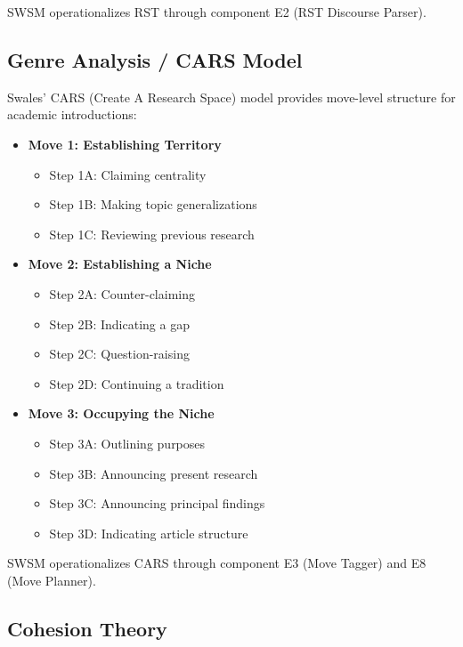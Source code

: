 SWSM operationalizes RST through component E2 (RST Discourse Parser).

\subsection{Genre Analysis / CARS Model}
\label{sec:sw-cars}

Swales' CARS (Create A Research Space) model \citep{swales1990genre} provides move-level structure for academic introductions:

\begin{itemize}
    \item \textbf{Move 1: Establishing Territory}
    \begin{itemize}
        \item Step 1A: Claiming centrality
        \item Step 1B: Making topic generalizations
        \item Step 1C: Reviewing previous research
    \end{itemize}
    \item \textbf{Move 2: Establishing a Niche}
    \begin{itemize}
        \item Step 2A: Counter-claiming
        \item Step 2B: Indicating a gap
        \item Step 2C: Question-raising
        \item Step 2D: Continuing a tradition
    \end{itemize}
    \item \textbf{Move 3: Occupying the Niche}
    \begin{itemize}
        \item Step 3A: Outlining purposes
        \item Step 3B: Announcing present research
        \item Step 3C: Announcing principal findings
        \item Step 3D: Indicating article structure
    \end{itemize}
\end{itemize}

SWSM operationalizes CARS through component E3 (Move Tagger) and E8 (Move Planner).

\subsection{Cohesion Theory}
\label{sec:sw-cohesion}

